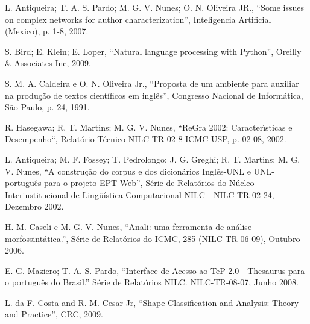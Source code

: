 \documentclass[a4paper,12pt,titlepage]{article}
\begin{document}
\begin{thebibliography}{1}
 L. Antiqueira; T. A. S. Pardo; M. G. V. Nunes; O. N. Oliveira JR., ``Some issues on complex networks for author characterization'', Inteligencia Artificial (Mexico), p. 1-8, 2007.


 S. Bird; E. Klein; E. Loper, ``Natural language processing with Python'', Oreilly \& Associates Inc, 2009.

 S. M. A. Caldeira e O. N. Oliveira Jr., ``Proposta de um ambiente para auxiliar na produção de textos científicos em inglês'', Congresso Nacional de Informática, São Paulo, p. 24, 1991.

 R. Hasegawa; R. T. Martins; M. G. V. Nunes, ``ReGra 2002: Caracter{\'\i}sticas e Desempenho``, Relat{\'o}rio T{\'e}cnico NILC-TR-02-8 ICMC-USP, p. 02-08, 2002.

 L. Antiqueira; M. F. Fossey; T. Pedrolongo; J. G. Greghi; R. T. Martins; M. G. V. Nunes, ``A construção do corpus e dos dicionários Inglês-UNL e UNL-português para o projeto EPT-Web'', Série de Relatórios do Núcleo Interinstitucional de Lingüística Computacional NILC - NILC-TR-02-24, Dezembro 2002.

 H. M. Caseli e M. G. V. Nunes, ``Anali: uma ferramenta de análise morfossintática.'', Série de Relatórios do ICMC, 285 (NILC-TR-06-09), Outubro 2006.

 E. G. Maziero; T. A. S. Pardo, ``Interface de Acesso ao TeP 2.0 - Thesaurus para o português do Brasil.'' Série de Relatórios NILC. NILC-TR-08-07, Junho 2008. 


 L. da F. Costa and R. M. Cesar Jr, ``Shape Classification and Analysis: Theory and Practice'', CRC, 2009.

\end{thebibliography}
\end{document}
